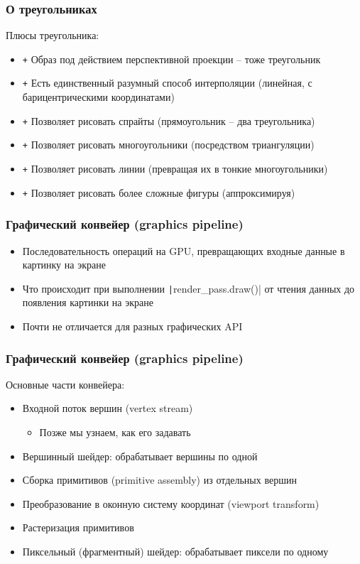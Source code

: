 \documentclass[10pt]{beamer}
\begin{document}
\begin{frame}
\frametitle{О треугольниках}
Плюсы треугольника:
\pause
\begin{itemize}
\item {\color{green}\texttt{+}} Образ под действием перспективной проекции -- тоже треугольник
\pause
\item {\color{green}\texttt{+}} Есть единственный разумный способ интерполяции (линейная, с барицентрическими координатами)
\pause
\item {\color{green}\texttt{+}} Позволяет рисовать спрайты (прямоугольник -- два треугольника)
\pause
\item {\color{green}\texttt{+}} Позволяет рисовать многоугольники (посредством триангуляции)
\pause
\item {\color{green}\texttt{+}} Позволяет рисовать линии (превращая их в тонкие многоугольники)
\pause
\item {\color{green}\texttt{+}} Позволяет рисовать более сложные фигуры (аппроксимируя)
\end{itemize}
\end{frame}

\begin{frame}[fragile]
\frametitle{Графический конвейер (graphics pipeline)}
\begin{itemize}
\item Последовательность операций на GPU, превращающих входные данные в картинку на экране
\pause
\item Что происходит при выполнении \texttt|render_pass.draw()| от чтения данных до появления картинки на экране
\pause
\item Почти не отличается для разных графических API
\end{itemize}
\end{frame}

\begin{frame}[fragile]
\frametitle{Графический конвейер (graphics pipeline)}
Основные части конвейера:
\begin{itemize}
\item Входной поток вершин (vertex stream)
\pause
\begin{itemize}
\item Позже мы узнаем, как его задавать
\end{itemize}
\pause
\item Вершинный шейдер: обрабатывает вершины по одной
\pause
\item Сборка примитивов (primitive assembly) из отдельных вершин
\pause
\item Преобразование в оконную систему координат (viewport transform)
\pause
\item Растеризация примитивов
\pause
\item Пиксельный (фрагментный) шейдер: обрабатывает пиксели по одному
\end{itemize}
\end{frame}
\end{document}
